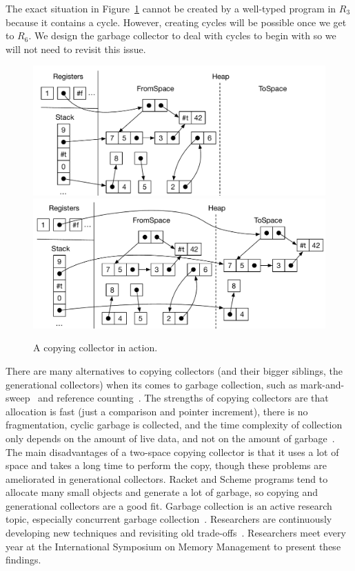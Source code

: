 \documentclass[11pt]{book}
\begin{document}
The exact situation in Figure~\ref{fig:copying-collector} cannot be
created by a well-typed program in $R_3$ because it contains a
cycle. However, creating cycles will be possible once we get to $R_6$.
We design the garbage collector to deal with cycles to begin with so
we will not need to revisit this issue.

\begin{figure}[tbp]
\centering
\includegraphics[width=\textwidth]{figs/copy-collect-1} \\[5ex]
\includegraphics[width=\textwidth]{figs/copy-collect-2}
\caption{A copying collector in action.}
\label{fig:copying-collector}
\end{figure}

There are many alternatives to copying collectors (and their bigger
siblings, the generational collectors) when its comes to garbage
collection, such as mark-and-sweep~\citep{McCarthy:1960dz} and
reference counting~\citep{Collins:1960aa}.  The strengths of copying
collectors are that allocation is fast (just a comparison and pointer
increment), there is no fragmentation, cyclic garbage is collected,
and the time complexity of collection only depends on the amount of
live data, and not on the amount of garbage~\citep{Wilson:1992fk}. The
main disadvantages of a two-space copying collector is that it uses a
lot of space and takes a long time to perform the copy, though these
problems are ameliorated in generational collectors.  Racket and
Scheme programs tend to allocate many small objects and generate a lot
of garbage, so copying and generational collectors are a good fit.
Garbage collection is an active research topic, especially concurrent
garbage collection~\citep{Tene:2011kx}. Researchers are continuously
developing new techniques and revisiting old
trade-offs~\citep{Blackburn:2004aa,Jones:2011aa,Shahriyar:2013aa,Cutler:2015aa,Shidal:2015aa,Osterlund:2016aa,Jacek:2019aa,Gamari:2020aa}. Researchers
meet every year at the International Symposium on Memory Management to
present these findings.
\end{document}
